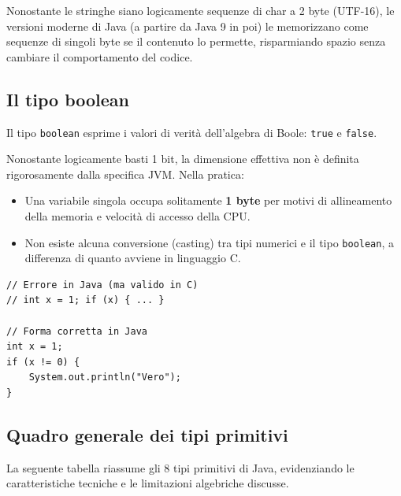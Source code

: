 \begin{warningbox}[]
Nonostante le stringhe siano logicamente sequenze di char a 2 byte (UTF-16), le versioni moderne di Java (a partire da Java 9 in poi) le memorizzano come sequenze di singoli byte se il contenuto lo permette, risparmiando spazio senza cambiare il comportamento del codice.
\end{warningbox}

\subsection{Il tipo boolean}

Il tipo \texttt{boolean} esprime i valori di verità dell'algebra di Boole: \texttt{true} e \texttt{false}.

\begin{observation}
Nonostante logicamente basti 1 bit, la dimensione effettiva non è definita rigorosamente dalla specifica JVM. Nella pratica:
\begin{itemize}
    \item Una variabile singola occupa solitamente \textbf{1 byte} per motivi di allineamento della memoria e velocità di accesso della CPU.
    \item Non esiste alcuna conversione (casting) tra tipi numerici e il tipo \texttt{boolean}, a differenza di quanto avviene in linguaggio C.
\end{itemize}
\end{observation}

\begin{lstlisting}[caption={Rigidità del tipo boolean}]
// Errore in Java (ma valido in C)
// int x = 1; if (x) { ... } 

// Forma corretta in Java
int x = 1;
if (x != 0) { 
    System.out.println("Vero");
}
\end{lstlisting}

\subsection{Quadro generale dei tipi primitivi}

La seguente tabella riassume gli 8 tipi primitivi di Java, evidenziando le caratteristiche tecniche e le limitazioni algebriche discusse.

